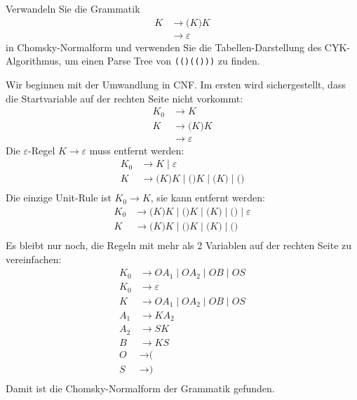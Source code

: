 Verwandeln Sie die Grammatik
\begin{align*}
K&\to \texttt{(}K\texttt{)}K \\
 &\to \varepsilon
\end{align*}
in Chomsky-Normalform und verwenden Sie die Tabellen-Darstellung
des CYK-Algorithmus, um einen Parse Tree von \texttt{(()(()))}
zu finden.

\begin{loesung}
Wir beginnen mit der Umwandlung in CNF.
Im ersten wird sichergestellt, dass die Startvariable auf der rechten
Seite nicht vorkommt:
\begin{align*}
K_0&\to K \\
K  &\to \texttt{(}K\texttt{)}K \\
   &\to \varepsilon
\end{align*}
Die $\varepsilon$-Regel $K\to\varepsilon$ muss entfernt werden:
\begin{align*}
K_0&\to K \;|\; \varepsilon\\
K  &\to \texttt{(}K\texttt{)}K \;|\; \texttt{()}K \;|\; \texttt{(}K\texttt{)} \;|\; \texttt{()}\\
\end{align*}
Die einzige Unit-Rule ist $K_0\to K$, sie kann entfernt werden:
\begin{align*}
K_0&\to \texttt{(}K\texttt{)}K \;|\; \texttt{()}K \;|\; \texttt{(}K\texttt{)} \;|\; \texttt{()}
\;|\; \varepsilon\\
K  &\to \texttt{(}K\texttt{)}K \;|\; \texttt{()}K \;|\; \texttt{(}K\texttt{)} \;|\; \texttt{()}\\
\end{align*}
Es bleibt nur noch, die Regeln mit mehr als 2 Variablen auf der rechten
Seite zu vereinfachen:
\begin{align*}
K_0
&\to
OA_1
\;|\;
OA_2
\;|\;
OB
\;|\;
OS
\\
K_0&\to
\varepsilon
\\
K
&\to
OA_1
\;|\;
OA_2
\;|\;
OB
\;|\;
OS
\\
A_1&\to KA_2 \\
A_2&\to SK \\
B  &\to KS \\
O&\to \texttt{(} \\
S&\to \texttt{)} \\
\end{align*}
Damit ist die Chomsky-Normalform der Grammatik gefunden.



\end{loesung}
